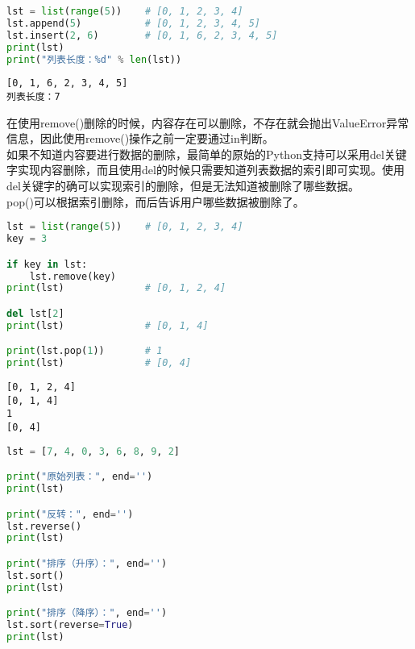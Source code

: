 \vspace{0.5cm}


\begin{lstlisting}[language=Python]
lst = list(range(5))    # [0, 1, 2, 3, 4]
lst.append(5)           # [0, 1, 2, 3, 4, 5]
lst.insert(2, 6)        # [0, 1, 6, 2, 3, 4, 5]
print(lst)
print("列表长度：%d" % len(lst))
\end{lstlisting}

\begin{tcolorbox}
	\begin{verbatim}
[0, 1, 6, 2, 3, 4, 5]
列表长度：7
\end{verbatim}
\end{tcolorbox}

在使用remove()删除的时候，内容存在可以删除，不存在就会抛出ValueError异常信息，因此使用remove()操作之前一定要通过in判断。\\

如果不知道内容要进行数据的删除，最简单的原始的Python支持可以采用del关键字实现内容删除，而且使用del的时候只需要知道列表数据的索引即可实现。使用del关键字的确可以实现索引的删除，但是无法知道被删除了哪些数据。\\

pop()可以根据索引删除，而后告诉用户哪些数据被删除了。\\


\begin{lstlisting}[language=Python]
lst = list(range(5))    # [0, 1, 2, 3, 4]
key = 3

if key in lst:
    lst.remove(key)
print(lst)              # [0, 1, 2, 4]

del lst[2]
print(lst)              # [0, 1, 4]

print(lst.pop(1))       # 1
print(lst)              # [0, 4]
\end{lstlisting}

\begin{tcolorbox}
	\begin{verbatim}
[0, 1, 2, 4]
[0, 1, 4]
1
[0, 4]
\end{verbatim}
\end{tcolorbox}

\vspace{0.5cm}


\begin{lstlisting}[language=Python]
lst = [7, 4, 0, 3, 6, 8, 9, 2]

print("原始列表：", end='')
print(lst)

print("反转：", end='')
lst.reverse()
print(lst)

print("排序（升序）：", end='')
lst.sort()
print(lst)

print("排序（降序）：", end='')
lst.sort(reverse=True)
print(lst)
\end{lstlisting}

